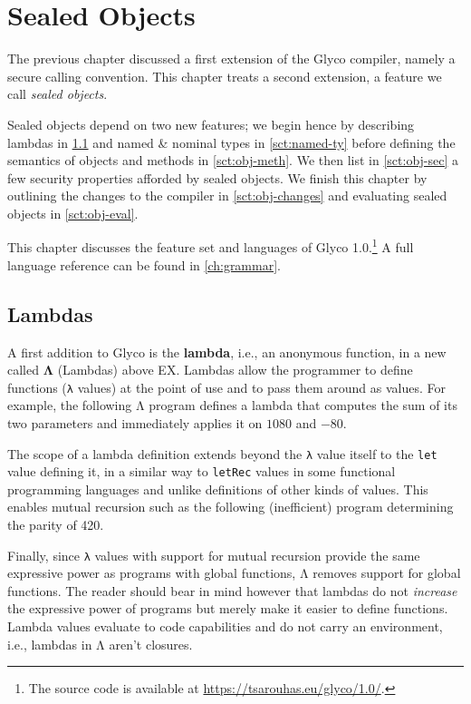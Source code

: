 \documentclass[main.tex]{subfiles}
\begin{document}
\onlyinsubfile{\mainmatter{}}

\chapter{Sealed Objects}
The previous chapter discussed a first extension of the Glyco compiler, namely a secure calling convention. This chapter treats a second extension, a feature we call \emph{sealed objects}.

Sealed objects depend on two new features; we begin hence by describing lambdas in \cref{sct:lambda} and named \& nominal types in \cref{sct:named-ty} before defining the semantics of objects and methods in \cref{sct:obj-meth}. We then list in \cref{sct:obj-sec} a few security properties afforded by sealed objects. We finish this chapter by outlining the changes to the compiler in \cref{sct:obj-changes} and evaluating sealed objects in \cref{sct:obj-eval}.

This chapter discusses the feature set and languages of Glyco 1.0.\footnote{The source code is available at \url{https://tsarouhas.eu/glyco/1.0/}.} A full language reference can be found in \cref{ch:grammar}.

\section{Lambdas} \label{sct:lambda}
A first addition to Glyco is the \textbf{lambda}, i.e., an anonymous function, in a new  called \textbf{Λ} (Lambdas) above EX. Lambdas allow the programmer to define functions (\texttt{λ} values) at the point of use and to pass them around as values. For example, the following Λ program defines a lambda that computes the sum of its two parameters and immediately applies it on $1080$ and $-80$.

The scope of a lambda definition extends beyond the \texttt{λ} value itself to the \texttt{let} value defining it, in a similar way to \texttt{letRec} values in some functional programming languages and unlike definitions of other kinds of values. This enables mutual recursion such as the following (inefficient) program determining the parity of 420.

Finally, since \texttt{λ} values with support for mutual recursion provide the same expressive power as programs with global functions, Λ removes support for global functions. The reader should bear in mind however that lambdas do not \emph{increase} the expressive power of programs but merely make it easier to define functions. Lambda values evaluate to code capabilities and do not carry an environment, i.e., lambdas in Λ aren't closures.
\end{document}
